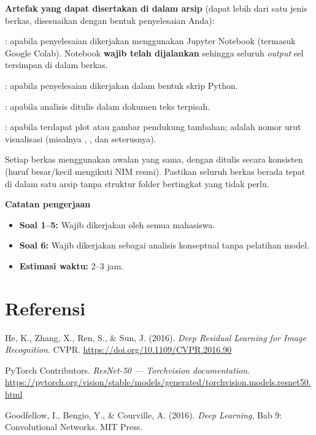 \documentclass[12pt, a4paper]{article}
\begin{document}
\textbf{Artefak yang dapat disertakan di dalam arsip} (dapat lebih dari satu jenis berkas, disesuaikan dengan bentuk penyelesaian Anda):
\begin{borderedsquare}
  \item {}: apabila penyelesaian dikerjakan menggunakan Jupyter Notebook (termasuk Google Colab). Notebook \textbf{wajib telah dijalankan} sehingga seluruh \emph{output} sel tersimpan di dalam berkas.
  \item {}: apabila penyelesaian dikerjakan dalam bentuk skrip Python.
  \item {}: apabila analisis ditulis dalam dokumen teks terpisah.
  \item {}: apabila terdapat plot atau gambar pendukung tambahan;  adalah nomor urut visualisasi (misalnya , , dan seterusnya).
\end{borderedsquare}

Setiap berkas menggunakan awalan  yang sama, dengan  ditulis secara konsisten (huruf besar/kecil mengikuti NIM resmi). Pastikan seluruh berkas berada tepat di dalam satu arsip  tanpa struktur folder bertingkat yang tidak perlu.

\begin{callout}[ctpBlue]
\textbf{\color{ctpBlue}Catatan pengerjaan}
\begin{itemize}
  \item \textbf{Soal 1--5:} Wajib dikerjakan oleh semua mahasiswa.
  \item \textbf{Soal 6:} Wajib dikerjakan sebagai analisis konseptual tanpa pelatihan model.
  \item \textbf{Estimasi waktu:} 2--3 jam.
\end{itemize}
\end{callout}

\section*{Referensi}
{\small\color{ctpSubtext}
\begin{enumerate}[label={[\arabic*]}, leftmargin=2em]
  \item He, K., Zhang, X., Ren, S., \& Sun, J. (2016). \emph{Deep Residual Learning for Image Recognition}. CVPR. \url{https://doi.org/10.1109/CVPR.2016.90}
  \item PyTorch Contributors. \emph{ResNet-50 --- Torchvision documentation}. \url{https://pytorch.org/vision/stable/models/generated/torchvision.models.resnet50.html}
  \item Goodfellow, I., Bengio, Y., \& Courville, A. (2016). \emph{Deep Learning}, Bab 9: Convolutional Networks. MIT Press.
\end{enumerate}}
\end{document}
